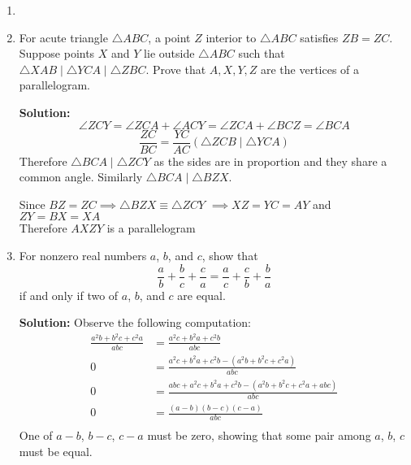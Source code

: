 \documentclass{article}
\begin{document}
\begin{enumerate}[itemsep=24pt]
\item 


\item 
For acute triangle $\triangle ABC$, a point $Z$ interior to $\triangle ABC$ satisfies $ZB = ZC$.
Suppose points $X$ and $Y$ lie outside $\triangle ABC$ such that $\triangle XAB \mathop{|||} \triangle YCA \mathop{|||} \triangle ZBC$.
Prove that $A,X,Y,Z$ are the vertices of a parallelogram. 

\textbf{Solution:} $$\angle ZCY = \angle ZCA + \angle ACY = \angle ZCA + \angle BCZ = \angle BCA$$
$$\frac{ZC}{BC} = \frac{YC}{AC} (\triangle ZCB \mathop{|||} \triangle YCA)$$
Therefore $\triangle BCA \mathop{|||} \triangle ZCY$ as the sides are in proportion and they share a common angle. Similarly $\triangle BCA \mathop{|||} \triangle BZX$. 

Since $BZ = ZC \implies \triangle BZX \equiv \triangle ZCY$
$\implies XZ = YC = AY$ and $ZY = BX = XA$\\
Therefore $AXZY$ is a parallelogram 


\item
For nonzero real numbers $a$, $b$, and $c$, show that
\[ \frac{a}{b} +\frac{b}{c} +\frac{c}{a} = \frac{a}{c} +\frac{c}{b} +\frac{b}{a} \]
if and only if two of $a$, $b$, and $c$ are equal.

\textbf{Solution:} Observe the following computation:
\begin{align*}
\frac{a^{2}b + b^{2}c + c^{2}a}{abc} & = \frac{a^{2}c + b^{2}a + c^{2}b}{abc}\\
 0 & = \frac{a^{2}c + b^{2}a + c^{2}b -(a^{2}b + b^{2}c + c^{2}a)}{abc} \\
 0 & = \frac{abc + a^{2}c + b^{2}a + c^{2}b - (a^{2}b + b^{2}c + c^{2}a+abc)}{abc} \\
 0 & = \frac{(a-b)(b-c)(c-a)}{abc} \\
\end{align*}
One of $a-b$, $b-c$, $c-a$ must be zero, showing that some pair among $a$, $b$, $c$ must be equal.

\end{enumerate}
\end{document}
